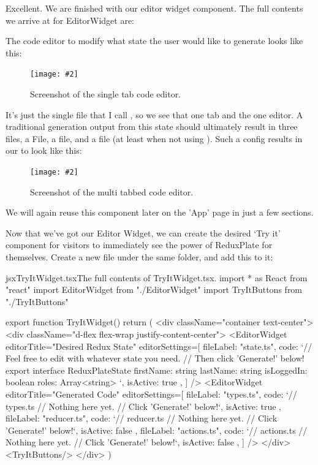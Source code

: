 \documentclass[paper=6in:9in,pagesize=pdftex,headinclude=on,footinclude=on,12pt,twoside]{scrbook}
\newcommand{\standardfigure}[3]{\begin{figure}[H]\begin{center}\texttt{[image: \#2]}\caption{#3}\label{fig:#2}\end{center}\end{figure}}
\begin{document}
Excellent. We are finished with our editor widget component. The full contents we arrive at for EditorWidget are:


The code editor to modify what state the user would like to generate looks like this:

\standardfigure{\textwidth}{frontend/components/single-editor}{Screenshot of the single tab code editor.}

It's just the single file that I call , so we see that one tab and the one editor. A traditional generation output from this state should ultimately result in three files, a  File, a  file, and a  file (at least when not using ). Such a config results in our  to look like this:

\standardfigure{\textwidth}{frontend/components/multi-editor}{Screenshot of the multi tabbed code editor.}

We will again reuse this component later on the 'App' page in just a few sections.


Now that we've got our Editor Widget, we can create the desired `Try it' component for visitors to immediately see the power of ReduxPlate for themselves. Create a new file  under the same  folder, and add this to it:

\begin{codeInput}{jsx}{TryItWidget.tsx}{The full contents of TryItWidget.tsx.}
import * as React from "react"
import { EditorWidget } from "./EditorWidget"
import { TryItButtons } from "./TryItButtons"

export function TryItWidget() {
  return (
    <div className="container text-center">
      <div className="d-flex flex-wrap justify-content-center">
        <EditorWidget
          editorTitle="Desired Redux State"
          editorSettings={[
            {
              fileLabel: "state.ts",
              code: `// Feel free to edit with whatever state you need.
// Then click 'Generate!' below!
export interface ReduxPlateState {
  firstName: string
  lastName: string
  isLoggedIn: boolean
  roles: Array<string>
}`,
isActive: true
            },
          ]}
        />
        <EditorWidget
          editorTitle="Generated Code"
          editorSettings={[
            {
              fileLabel: "types.ts",
              code: `// types.ts
// Nothing here yet.
// Click 'Generate!' below!`,
isActive: true
            },
            {
              fileLabel: "reducer.ts",
              code: `// reducer.ts
// Nothing here yet.
// Click 'Generate!' below!`,
isActive: false
            },
            {
              fileLabel: "actions.ts",
              code: `// actions.ts
// Nothing here yet.
// Click 'Generate!' below!`,
isActive: false
            },
          ]}
        />
      </div>
      <TryItButtons/>
    </div>
  )
}
\end{codeInput}
\end{document}
